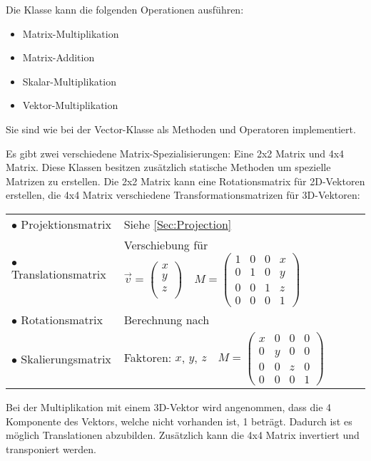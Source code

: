  Die Klasse kann die folgenden Operationen ausführen:
\begin{itemize}
	\item Matrix-Multiplikation
	\item Matrix-Addition
	\item Skalar-Multiplikation
	\item Vektor-Multiplikation
\end{itemize}
Sie sind wie bei der Vector-Klasse als Methoden und Operatoren implementiert.

Es gibt zwei verschiedene Matrix-Spezialisierungen: Eine 2x2 Matrix und 4x4 Matrix.
Diese Klassen besitzen zusätzlich statische Methoden um spezielle Matrizen zu erstellen. Die 2x2 Matrix kann eine Rotationsmatrix für 2D-Vektoren erstellen, die 4x4 Matrix verschiedene Transformationsmatrizen für 3D-Vektoren:
	\begin{longtable}[l]{ll}
		$\bullet$ Projektionsmatrix & Siehe \cref{Sec:Projection}\\
		$\bullet$ Translationsmatrix & Verschiebung für $\overrightarrow{v} = \begin{pmatrix}
		x \\ y \\ z \\\end{pmatrix} \quad M = \begin{pmatrix}
		1 & 0 & 0 & x \\
		0 & 1 & 0 & y \\
		0 & 0 & 1 & z \\
		0 & 0 & 0 & 1
		\end{pmatrix}$\\
		$\bullet$ Rotationsmatrix & Berechnung nach \cite{WikiRotation}\\
		$\bullet$ Skalierungsmatrix & Faktoren: $x$, $y$, $z \quad M = \begin{pmatrix}
		x & 0 & 0 & 0 \\
		0 & y & 0 & 0 \\
		0 & 0 & z & 0 \\
		0 & 0 & 0 & 1
		\end{pmatrix}$\\
	\end{longtable}

 Bei der Multiplikation mit einem 3D-Vektor wird angenommen, dass die 4 Komponente des Vektors, welche nicht vorhanden ist, 1 beträgt. Dadurch ist es möglich Translationen abzubilden. Zusätzlich kann die 4x4 Matrix invertiert und transponiert werden.  

